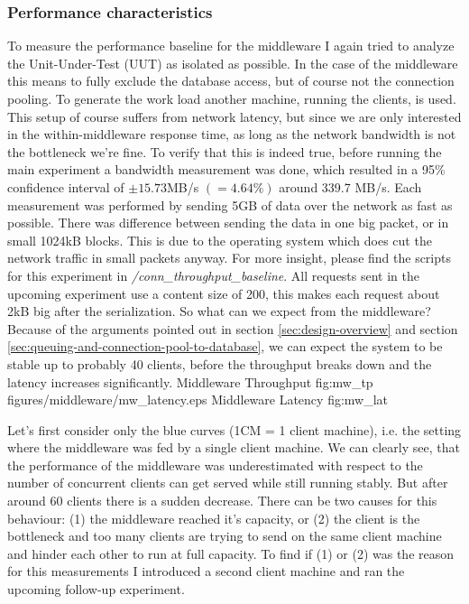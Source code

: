 \documentclass[11pt]{article}
\begin{document}
\subsubsection{Performance characteristics}\label{sec:performance-characteristics-1}
To measure the performance baseline for the middleware I again tried to analyze the Unit-Under-Test (UUT) as isolated as possible. In the case of the middleware this means to fully exclude the database access, but of course not the connection pooling. To generate the work load another machine, running the clients, is used. This setup of course suffers from network latency, but since we are only interested in the within-middleware response time, as long as the network bandwidth is not the bottleneck we're fine. To verify that this is indeed true, before running the main experiment a bandwidth measurement was done, which resulted in a 95\% confidence interval of $\pm15.73$MB/s $(=4.64\%)$ around 339.7 MB/s. Each measurement was performed by sending 5GB of data over the network as fast as possible. There was difference between sending the data in one big packet, or in small 1024kB blocks. This is due to the operating system which does cut the network traffic in small packets anyway. For more insight, please find the scripts for this experiment in \textit{/conn\_throughput\_baseline}. All requests sent in the upcoming experiment use a content size of 200, this makes each request about 2kB big after the serialization. So what can we expect from the middleware? Because of the arguments pointed out in section \ref{sec:design-overview} and section \ref{sec:queuing-and-connection-pool-to-database}, we can expect the system to be stable up to probably 40 clients, before the throughput breaks down and the latency increases significantly.
 {Middleware Throughput} {fig:mw_tp}
{figures/middleware/mw_latency.eps} {Middleware Latency} {fig:mw_lat}

Let's first consider only the blue curves (1CM = 1 client machine), i.e. the setting where the middleware was fed by a single client machine. We can clearly see, that the performance of the middleware was underestimated with respect to the number of concurrent clients can get served while still running stably. But after around 60 clients there is a sudden decrease. There can be two causes for this behaviour: (1) the middleware reached it's capacity, or (2) the client is the bottleneck and too many clients are trying to send on the same client machine and hinder each other to run at full capacity. To find if (1) or (2) was the reason for this measurements I introduced a second client machine and ran the upcoming follow-up experiment.
\end{document}

